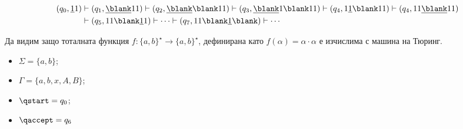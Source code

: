 \begin{example}
\begin{align*}
  (q_0, \underline{1}1) & \vdash (q_1, \underline{\blank}11) \vdash  (q_2, \underline{\blank} \blank 11) \vdash  (q_3, \underline{\blank} 1 \blank 11) \vdash (q_4, 1\underline{1}\blank 11) \vdash (q_4, 11 \underline{\blank} 11)\\
  & \vdash (q_5, 11\blank \underline{1}1) \vdash \cdots \vdash (q_7, 11 \blank \underline{1}\blank) \vdash \cdots
\end{align*}

\end{example}


\begin{example}
  Да видим защо тоталната функция $f:\{a,b\}^\star \to \{a,b\}^\star$, дефинирана като
  $f(\alpha) = \alpha\cdot\alpha$ е изчислима с машина на Тюринг.
  
  \begin{itemize}
  \item
    $\Sigma = \{a,b\}$;
  \item 
    $\Gamma = \{a,b,x,A,B\}$;
  \item
    $\qstart = q_0$;
  \item
    $\qaccept = q_6$
  \end{itemize}
  
  \begin{framed}
  \begin{figure}[H]
    \begin{center}
\end{center}
\end{figure}
\end{framed}
\end{example}
